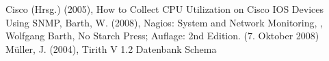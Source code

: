 Cisco (Hrsg.) (2005), How to Collect CPU Utilization on Cisco IOS Devices Using SNMP, 
Barth, W. (2008), Nagios: System and Network Monitoring,  , Wolfgang Barth, No Starch Press; Auflage: 2nd Edition. (7. Oktober 2008)
Müller, J. (2004), Tirith V 1.2 Datenbank Schema 


